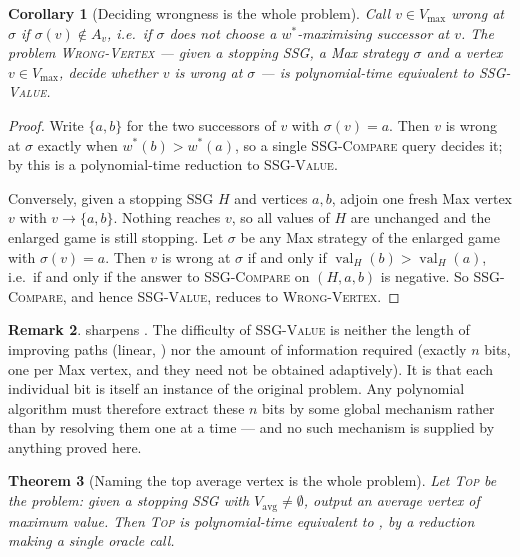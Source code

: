 \documentclass[11pt]{article}
\theoremstyle{plain}
\newtheorem{theorem}{Theorem}[section]
\newtheorem{corollary}[theorem]{Corollary}
\theoremstyle{definition}
\newtheorem{remark}[theorem]{Remark}
\DeclareMathOperator{\val}{val}
\newcommand{\Vmax}{V_{\max}}
\newcommand{\Vavg}{V_{\mathrm{avg}}}
\begin{document}
\begin{corollary}[Deciding wrongness is the whole problem]\label{cor:wrong-equivalence}
Call $v\in\Vmax$ \emph{wrong} at $\sigma$ if $\sigma(v)\notin A_v$, i.e.\
if $\sigma$ does not choose a $w^\ast$-maximising successor at $v$. The
problem \textsc{Wrong-Vertex} --- given a stopping SSG, a Max strategy
$\sigma$ and a vertex $v\in\Vmax$, decide whether $v$ is wrong at
$\sigma$ --- is polynomial-time equivalent to \textsc{SSG-Value}.
\end{corollary}

\begin{proof}
Write $\{a,b\}$ for the two successors of $v$ with $\sigma(v)=a$. Then
$v$ is wrong at $\sigma$ exactly when $w^\ast(b)>w^\ast(a)$, so a single
\textsc{SSG-Compare} query decides it; by
 this is a polynomial-time reduction to
\textsc{SSG-Value}.

Conversely, given a stopping SSG $H$ and vertices $a,b$, adjoin one fresh
Max vertex $v$ with $v\to\{a,b\}$. Nothing reaches $v$, so all values of
$H$ are unchanged and the enlarged game is still stopping. Let $\sigma$
be any Max strategy of the enlarged game with $\sigma(v)=a$. Then $v$ is
wrong at $\sigma$ if and only if $\val_H(b)>\val_H(a)$, i.e.\ if and only
if the answer to \textsc{SSG-Compare} on $(H,a,b)$ is negative. So
\textsc{SSG-Compare}, and hence \textsc{SSG-Value}, reduces to
\textsc{Wrong-Vertex}.
\end{proof}

\begin{remark}
 sharpens . The
difficulty of \textsc{SSG-Value} is neither the length of improving paths
(linear, \Cref{thm:short-path}) nor the amount of information required
(exactly $n$ bits, one per Max vertex, and they need not be obtained
adaptively). It is that each individual bit is itself an instance of the
original problem. Any polynomial algorithm must therefore extract these
$n$ bits by some global mechanism rather than by resolving them one at a
time --- and no such mechanism is supplied by anything proved here.
\end{remark}

\begin{theorem}[Naming the top average vertex is the whole problem]\label{thm:top}
Let \textsc{Top} be the problem: given a stopping SSG with
$\Vavg\ne\emptyset$, output an average vertex of maximum value. Then
\textsc{Top} is polynomial-time equivalent to \Cref{prob:main}, by a
reduction making a single oracle call.
\end{theorem}
\end{document}
